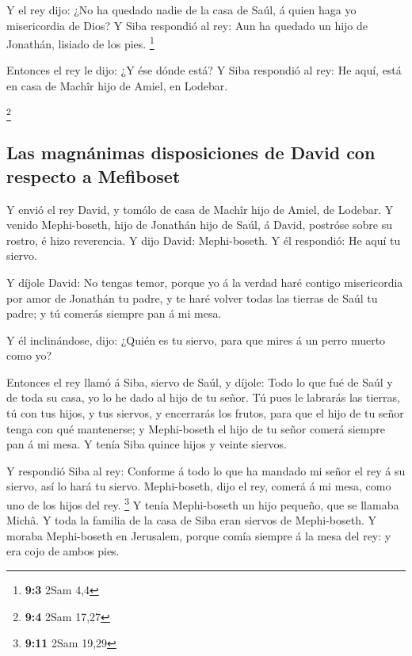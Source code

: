  Y el rey dijo: ¿No ha quedado nadie de la casa de Saúl, á
quien haga yo misericordia de Dios? Y Siba respondió al rey: Aun ha
quedado un hijo de Jonathán, lisiado de los pies. \footnote{\textbf{9:3}
  2Sam 4,4}

 Entonces el rey le dijo: ¿Y ése dónde está? Y Siba
respondió al rey: He aquí, está en casa de Machîr hijo de Amiel, en
Lodebar.

\footnote{\textbf{9:4} 2Sam 17,27}

\hypertarget{las-magnuxe1nimas-disposiciones-de-david-con-respecto-a-mefiboset}{%
\subsection{Las magnánimas disposiciones de David con respecto a
Mefiboset}\label{las-magnuxe1nimas-disposiciones-de-david-con-respecto-a-mefiboset}}

 Y envió el rey David, y tomólo de casa de Machîr hijo de
Amiel, de Lodebar.  Y venido Mephi-boseth, hijo de
Jonathán hijo de Saúl, á David, postróse sobre su rostro, é hizo
reverencia. Y dijo David: Mephi-boseth. Y él respondió: He aquí tu
siervo.

 Y díjole David: No tengas temor, porque yo á la verdad
haré contigo misericordia por amor de Jonathán tu padre, y te haré
volver todas las tierras de Saúl tu padre; y tú comerás siempre pan á mi
mesa.

 Y él inclinándose, dijo: ¿Quién es tu siervo, para que
mires á un perro muerto como yo?

 Entonces el rey llamó á Siba, siervo de Saúl, y díjole:
Todo lo que fué de Saúl y de toda su casa, yo lo he dado al hijo de tu
señor.  Tú pues le labrarás las tierras, tú con tus
hijos, y tus siervos, y encerrarás los frutos, para que el hijo de tu
señor tenga con qué mantenerse; y Mephi-boseth el hijo de tu señor
comerá siempre pan á mi mesa. Y tenía Siba quince hijos y veinte
siervos.

 Y respondió Siba al rey: Conforme á todo lo que ha
mandado mi señor el rey á su siervo, así lo hará tu siervo.
Mephi-boseth, dijo el rey, comerá á mi mesa, como uno de los hijos del
rey. \footnote{\textbf{9:11} 2Sam 19,29}  Y tenía
Mephi-boseth un hijo pequeño, que se llamaba Michâ. Y toda la familia de
la casa de Siba eran siervos de Mephi-boseth.  Y moraba
Mephi-boseth en Jerusalem, porque comía siempre á la mesa del rey: y era
cojo de ambos pies.


